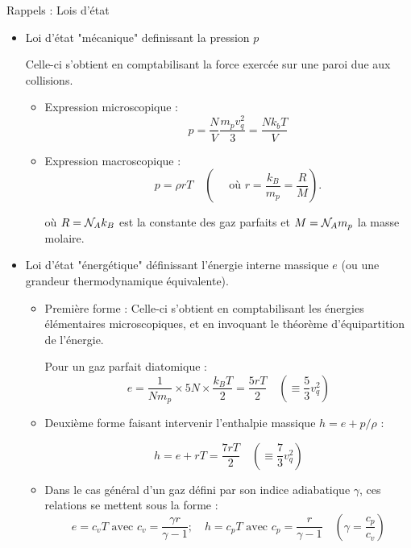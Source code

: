 \begin{frame}{Rappels : Lois d'état} 

\small 

\begin{itemize}

\item Loi d'état "mécanique" definissant la pression $p$

Celle-ci s'obtient en comptabilisant la force exercée sur une paroi due aux collisions.
\pause
\begin{itemize}

\item Expression microscopique : 
$$
\mbox{ } \quad 
p = \frac{N}{V} \frac{m_p v_q^2}{3} = \frac{N k_b T }{V }  
$$
 \pause
\item Expression macroscopique : 
$$ 
\mbox{ } \quad 
p = \rho r T \quad \left( \quad \mbox{ où }  r = \frac{k_B}{m_p} = \frac{R}{M} \right). 
$$

 où $R = {\cal N}_A k_B$ est la constante des gaz parfaits et $M ={\cal N}_A m_p $ la masse molaire. 
\end{itemize}
\pause
\item Loi d'état "énergétique" définissant l'énergie interne massique $e$ (ou une grandeur thermodynamique équivalente).
\begin{itemize}
\pause
\item 
Première forme : Celle-ci s'obtient en comptabilisant les énergies élémentaires microscopiques, et en invoquant le théorème d'équipartition de l'énergie.

Pour un gaz parfait diatomique :
$$
e = \frac{1}{N m_p} \times 5 N  \times \frac{k_B T}{2} = \frac{5 r T}{2} \quad \left( \equiv \frac{5}{3} v_q^2 \right)
$$

\pause
\item Deuxième forme faisant intervenir l'enthalpie massique $h = e + p/\rho$ : 

$$
h = e + r T = \frac{7 r T}{2}
\quad \left( \equiv \frac{7}{3} v_q^2 \right)
$$
\pause

\item Dans le cas général d'un gaz défini par son indice adiabatique $\gamma$, ces relations se mettent sous la forme :
$$
e = c_v T \mbox{ avec } c_v = \frac{\gamma r }{\gamma -1} ; \quad 
h = c_p T \mbox{ avec } c_p = \frac{ r }{\gamma -1}   \quad \left( \gamma = \frac{c_p}{c_v} \right)
$$
\end{itemize}



 \end{itemize}
\end{frame}



